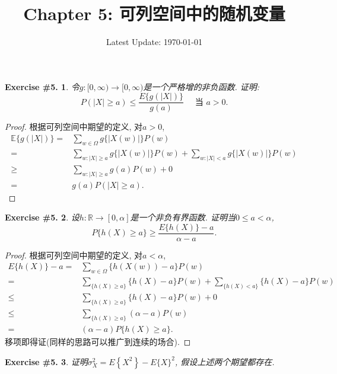 \documentclass[UTF8, a4paper]{article}
\title{Chapter 5: 可列空间中的随机变量}
\author{}
\date{Latest Update: \today}
\newtheorem{exercise}{Exercise \#5.}
\begin{document}
\maketitle


\begin{framed}
\begin{exercise}
令\(g : [0, \infty) \to [0, \infty)\)是一个严格增的非负函数. 证明:
$$
P(|X| \geq a) \leq \frac{E\{g(|X|)\}}{g(a)} \quad \text { 当 } a>0.
$$
\end{exercise}
\end{framed}


\begin{proof}
根据可列空间中期望的定义, 对\(a > 0\), 
$$
\begin{aligned}
    \mathbb{E}\{g(|X|)\} =& \sum_{w\in \Omega}^{} g\{|X(w)|\}P(w) \\
    =& \sum_{w: |X| \geq a}^{} g\{|X(w)|\}P(w) + \sum_{w: |X|< a}^{} g\{|X(w)|\}P(w) \\
    \geq & \sum_{w: |X| \geq a}^{} g(a)P(w) + 0 \\
    =& g(a)P(|X| \geq a).
\end{aligned}
$$
\end{proof}


\begin{framed}
\begin{exercise}
设\(h: \mathbb{R} \to [0,\alpha]\)是一个非负有界函数. 证明当\(0\leq a < \alpha \), 
$$
P\{h(X) \geq a\} \geq \frac{E\{h(X)\}-a}{\alpha-a}.
$$
\end{exercise}
\end{framed}


\begin{proof}
根据可列空间中期望的定义, 对\(a < \alpha\),
$$
\begin{aligned}
    E\{h(X)\} - a =& \sum_{w\in\Omega}^{} \{h(X(w)) - a\}P(w) \\
    =& \sum_{\{h(X) \geq a\}} \{h(X) - a\} P(w) + \sum_{\{h(X) < a\}} \{h(X) - a\}P(w) \\
    \leq & \sum_{\{h(X) \geq a\}} \{h(X) - a\} P(w) + 0 \\
    \leq & \sum_{\{h(X) \geq a\}} (\alpha - a) P(w) \\
    =& (\alpha - a) P\{h(X) \geq a\}.
\end{aligned}
$$
移项即得证(同样的思路可以推广到连续的场合).
\end{proof}

\begin{framed}
\begin{exercise}
证明$\sigma_X^2=E\left\{X^2\right\}-E\{X\}^2$, 假设上述两个期望都存在.
\end{exercise}
\end{framed}
\end{document}

